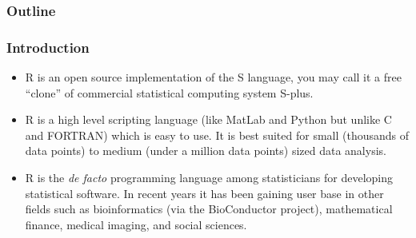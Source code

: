 \newcommand{\ensuretext}[1]{\ensuremath{\text{#1}}}
\def\ie{\ensuretext{\textit{i.e.,\xspace}}}
\def\eg{\ensuretext{\textit{e.g.,\xspace}}}

\newcommand{\uder}[2]{\frac{\partial #1}{\partial #2}}
\newcommand{\R}{\ensuremath{\mathbb{R}}}
\newcommand{\med}{\ensuremath{\mathop{\mathrm{med}}}}
\newcommand{\uPr}{\ensuremath{\mathop{\mathrm{Pr}}}}
\newcommand{\uE}{\ensuremath{\mathop{\mathrm{E}}}}
\newcommand{\ucov}[2]{\ensuremath{\mathop{\mathrm{cov}}(#1 ,\, #2)}}
\newcommand{\ucor}[2]{\ensuremath{\mathop{\mathrm{corr}}(#1 ,\, #2)}}
\newcommand{\ucorr}[2]{\ensuremath{\mathop{\mathrm{corr}}(#1 ,\, #2)}}
\newcommand{\uvar}{\ensuremath{\mathop{\mathrm{var}}}}
\newcommand{\ud}{\ensuremath{\mathrm{d}}}
\newcommand{\uProj}{\ensuremath{\mathop{\mathrm{Proj}}}}
\newcommand{\uimply}{\ensuremath{\;\Longrightarrow\;}}
\newcommand{\uequiv}{\ensuremath{\;\Longleftrightarrow\;}}
\newcommand{\uforall}{\textrm{ for all }}
\newcommand{\uSym}[1]{\ensuremath{\mathrm{Sym}(#1)}}
\newcommand{\uinner}[2]{\ensuremath{\langle #1 ,\; #2 \rangle}}
\newcommand{\urepeat}[2]{%
  \setcounter{myN}{0}
  \whiledo{\value{myN} < #1}{%
    \stepcounter{myN}#2}}
\newcommand{\uvec}[2][n]{\ensuremath{#2_1, \cdots, #2_{#1}}}
\newcommand{\umark}[1]{\marginpar{%
    \vskip-\baselineskip %
    \raggedright\footnotesize
    \itshape\hrule\smallskip#1\par\smallskip\hrule}}


\begin{frame}
  \titlepage
\end{frame}

\begin{frame}
  \frametitle{Outline}
  \tableofcontents
\end{frame}


\begin{frame}
  \frametitle{Introduction}
  \begin{itemize}
  \item R is an open source implementation of the S language, you may
    call it a free ``clone'' of commercial statistical computing
    system S-plus.
  \item R is a high level scripting language (like MatLab and Python
    but unlike C and FORTRAN) which is easy to use.  It is best suited
    for small (thousands of data points) to medium (under a million
    data points) sized data analysis.
  \item R is the \textit{de facto} programming language among
    statisticians for developing statistical software.  In recent
    years it has been gaining user base in other fields such as
    bioinformatics (via the BioConductor project), mathematical
    finance, medical imaging, and social sciences.
  \end{itemize}
\end{frame}

